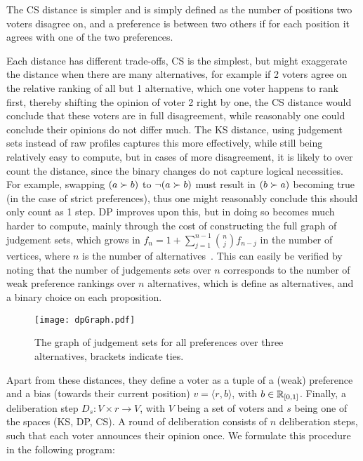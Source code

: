 The CS distance is simpler and is simply defined as the number of positions two
voters disagree on, and a preference is between two others if for each position
it agrees with one of the two preferences.

Each distance has different trade-offs, CS is the simplest, but might
exaggerate the distance when there are many alternatives, for example if 2
voters agree on the relative ranking of all but 1 alternative, which one voter
happens to rank first, thereby shifting the opinion of voter 2 right by one,
the CS distance would conclude that these voters are in full disagreement,
while reasonably one could conclude their opinions do not differ much. The KS
distance, using judgement sets instead of raw profiles captures this more
effectively, while still being relatively easy to compute, but in cases of more
disagreement, it is likely to over count the distance, since the binary changes
do not capture logical necessities. For example, swapping $( a \succ b)$ to
$\neg (a \succ b)$ must result in $(b \succ a)$ becoming true (in the case of
strict preferences), thus one might reasonably conclude this should only count
as 1 step. DP improves upon this, but in doing so becomes much harder to
compute, mainly through the cost of constructing the full graph of judgement
sets, which grows in $f_n = 1 + \sum_{j=1}^{n-1} \binom{n}{j} f_{n-j}$ in the
number of vertices, where $n$ is the number of alternatives~\cite{grossPreferentialArrangements1962}. This can easily be
verified by noting that the number of judgements sets over $n$ corresponds to
the number of weak preference rankings over $n$ alternatives, which is define
as alternatives, and a binary choice on each proposition.



\vspace{1em}
\begin{figure}[ht]
	\centering
	\texttt{[image: dpGraph.pdf]}
	\caption{The graph of judgement sets for all preferences over three alternatives, brackets indicate ties.}
	\label{figure:DPDistance}
\end{figure}

Apart from these distances, they define a voter as a tuple of a (weak)
preference and a bias (towards their current position) \(v = \langle r, b
\rangle\), with \( b \in \mathbb{R}_{[0,1]}\). Finally, a deliberation step \(D_{s}
: V \times r \to V\), with $V$ being a set of voters and $s$ being one of the
spaces (KS, DP, CS). A round of deliberation consists of $n$ deliberation
steps, such that each voter announces their opinion once. We formulate this
procedure in the following program:

